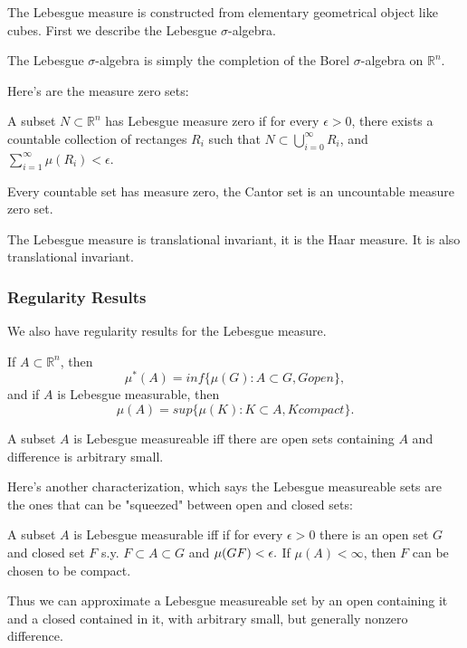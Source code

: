 \documentclass[main.tex]{subfiles}
\begin{document}
The Lebesgue measure is constructed from elementary geometrical object like cubes. First we describe the Lebesgue $\sigma$-algebra.

\begin{theorem}
The Lebesgue $\sigma$-algebra is simply the completion of the Borel $\sigma$-algebra on $\mathbb{R}^n$.
\end{theorem}

Here's are the measure zero sets:
\begin{lemma}
A subset $N \subset \mathbb{R}^n$ has Lebesgue measure zero if for every $\epsilon > 0$, there exists a countable collection of rectanges $R_i$ such that $N \subset \bigcup_{i = 0}^\infty R_i$, and $\sum_{i = 1} ^\infty \mu(R_i) < \epsilon$.
\end{lemma}

Every countable set has measure zero, the Cantor set is an uncountable measure zero set.

The Lebesgue measure is translational invariant, it is the Haar measure. It is also translational invariant. 


\subsubsection{Regularity Results}
We also have regularity results for the Lebesgue measure. 

\begin{theorem}
If $A \subset \mathbb{R}^n$, then 
$$
\mu^*(A) = inf\{\mu(G): A \subset G, G open\},
$$
and if $A$ is Lebesgue measurable, then 
$$
\mu(A) = sup \{\mu(K): K \subset A, K compact\}.
$$
\end{theorem}

A subset $A$ is Lebesgue measureable iff there are open sets containing $A$ and difference is arbitrary small.

Here's another characterization, which says the Lebesgue measureable sets are the ones that can be "squeezed" between open and closed sets:

\begin{theorem}
A subset $A$ is Lebesgue measurable iff if for every $\epsilon > 0$ there is an open set $G$ and closed set $F$ s.y. $F \subset A \subset G$ and $\mu(G\\F)< \epsilon.$ If $\mu(A) < \infty$, then $F$ can be chosen to be compact.
\end{theorem}

Thus we can approximate a Lebesgue measureable set by an open containing it and a closed contained in it, with arbitrary small, but generally nonzero difference.
\end{document}
